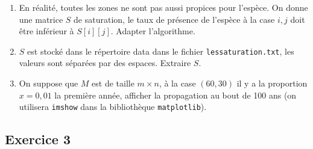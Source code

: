 \documentclass[10pt,fleqn]{article} %
\begin{document}
\begin{multicols}{2}
\begin{enumerate}
                
    
\item En réalité, toutes les zones ne sont pas aussi propices pour l'espèce. On donne une matrice $S$ de saturation, le taux de présence de l'espèce à la case $i,j$ doit être inférieur à $S[i][j]$.
Adapter l'algorithme.


\item $S$ est stocké dans le répertoire data dans le fichier \texttt{lessaturation.txt}, les valeurs sont séparées par des espaces. Extraire $S$.

\item On suppose que $M$ est de taille $m\times n$, à la case $(60,30)$ il y a la proportion $x=0,01$ la première année, afficher la propagation au bout de 100 ans (on utilisera \texttt{imshow} dans la bibliothèque \texttt{matplotlib}).

\end{enumerate}

\subsection*{Exercice 3}


\end{multicols}
\end{document}
